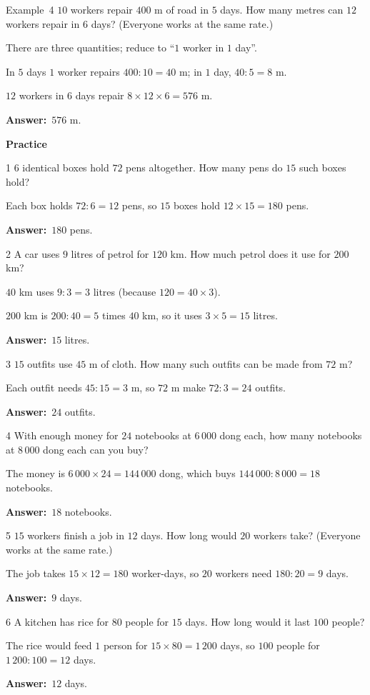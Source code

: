 \documentclass[11pt]{article}
\newif\ifsol \solfalse
\providecommand{\AnsWord}{Đáp số}
\newcommand{\dapso}[1]{\par\textbf{\AnsWord:}\ #1}
\newcommand{\guide}{\par\vspace{4pt}{\bfseries\color{tmBlue}\GuideWord}\par\vspace{3pt}\nopagebreak}
\newcommand{\probsol}[1]{%
  \begin{lrbox}{\solmeasure}\begin{minipage}{\dimexpr\linewidth-24pt\relax}#1\end{minipage}\end{lrbox}%
  \ifsol
    \begin{solbox}#1\end{solbox}%
  \else
    \setlength{\solht}{\dimexpr\ht\solmeasure+\dp\solmeasure+0.85cm\relax}%
    \ifdim\solht<1.35cm\setlength{\solht}{1.35cm}\fi
    \begin{tcolorbox}[colback=white,colframe=Line,boxrule=0.8pt,arc=5pt,
      left=8pt,right=8pt,top=4pt,bottom=4pt,height=\solht]{\footnotesize\color{Slate}\itshape\WorkWord}\end{tcolorbox}%
  \fi}
\newcommand{\dividerbar}[1]{\par\vspace{0.6em}\noindent
  \begin{tcolorbox}[enhanced,frame hidden,interior hidden,borderline west={5pt}{0pt}{ProbBlue},
    colback=white,left=12pt,right=12pt,top=5pt,bottom=5pt,arc=4pt]
  {\large\bfseries\color{ProbBlue} #1}\end{tcolorbox}\vspace{0.4em}}
\newcommand{\gap}{\vspace{0.3cm}}
\def\GuideWord{Guided solution.}
\def\WorkWord{Your work:}
\def\AnsWord{Answer}
\def\ExWord{Example}
\begin{document}
\gap
\begin{exbox}{\ExWord\ 4}
$10$ workers repair $400$ m of road in $5$ days. How many metres can $12$ workers repair in $6$ days? (Everyone works at the same rate.)
\guide
There are three quantities; reduce to ``$1$ worker in $1$ day''.\par
In $5$ days $1$ worker repairs $400:10=40$ m; in $1$ day, $40:5=8$ m.\par
$12$ workers in $6$ days repair $8\times12\times6=576$ m.
\dapso{$576$ m.}
\end{exbox}
\dividerbar{Practice}
\begin{probbox}{1}{\relax}
$6$ identical boxes hold $72$ pens altogether. How many pens do $15$ such boxes hold?
\end{probbox}
\probsol{
Each box holds $72:6=12$ pens, so $15$ boxes hold $12\times15=180$ pens.
\dapso{$180$ pens.}}
\gap
\begin{probbox}{2}{\relax}
A car uses $9$ litres of petrol for $120$ km. How much petrol does it use for $200$ km?
\end{probbox}
\probsol{
$40$ km uses $9:3=3$ litres (because $120=40\times3$).\par $200$ km is $200:40=5$ times $40$ km, so it uses $3\times5=15$ litres.
\dapso{$15$ litres.}}
\gap
\begin{probbox}{3}{\relax}
$15$ outfits use $45$ m of cloth. How many such outfits can be made from $72$ m?
\end{probbox}
\probsol{
Each outfit needs $45:15=3$ m, so $72$ m make $72:3=24$ outfits.
\dapso{$24$ outfits.}}
\gap
\begin{probbox}{4}{\relax}
With enough money for $24$ notebooks at $6\,000$ dong each, how many notebooks at $8\,000$ dong each can you buy?
\end{probbox}
\probsol{
The money is $6\,000\times24=144\,000$ dong, which buys $144\,000:8\,000=18$ notebooks.
\dapso{$18$ notebooks.}}
\gap
\begin{probbox}{5}{\relax}
$15$ workers finish a job in $12$ days. How long would $20$ workers take? (Everyone works at the same rate.)
\end{probbox}
\probsol{
The job takes $15\times12=180$ worker-days, so $20$ workers need $180:20=9$ days.
\dapso{$9$ days.}}
\gap
\begin{probbox}{6}{\relax}
A kitchen has rice for $80$ people for $15$ days. How long would it last $100$ people?
\end{probbox}
\probsol{
The rice would feed $1$ person for $15\times80=1\,200$ days, so $100$ people for $1\,200:100=12$ days.
\dapso{$12$ days.}}
\end{document}
